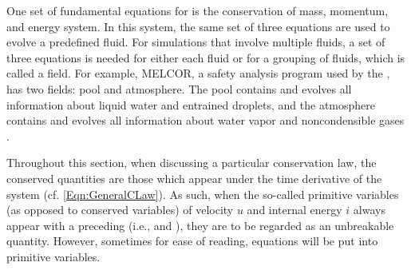 One set of fundamental equations for \TH is the conservation of mass, momentum, and energy system.
In this system, the same set of three equations are used to evolve a predefined fluid.
For simulations that involve multiple fluids, a set of three equations is needed for either each fluid or for a grouping of fluids, which is called a field.
For example, MELCOR, a safety analysis program used by the , has two fields: pool and atmosphere.
The pool contains and evolves all information about liquid water and entrained droplets, and the atmosphere contains and evolves all information about water vapor and noncondensible gases \cite{sandia_national_laboratories_melcor_2011}.

Throughout this section, when discussing a particular conservation law, the conserved quantities are those which appear under the time derivative of the system (cf. \cref{Eqn:GeneralCLaw}).
As such, when the so-called primitive variables (as opposed to conserved variables) of velocity $u$ and internal energy $i$ always appear with a preceding \rho (i.e., \rhou and \rhoi), they are to be regarded as an unbreakable quantity.
However, sometimes for ease of reading, equations will be put into primitive variables.

